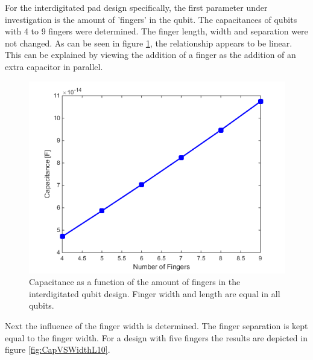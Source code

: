 For the interdigitated pad design specifically, the first parameter under investigation is the amount of 'fingers' in the  qubit. The capacitances of qubits with 4 to 9 fingers were determined. The finger length, width and separation were not changed.
As can be seen in figure \ref{fig:CapVSFingers}, the relationship appears to be linear. This can be explained by viewing the addition of a finger as the addition of an extra capacitor in parallel.\\

\begin{figure}
	\centering
	\includegraphics[scale = 0.7]{Figures/Capacitance_Plots/CapVSFingers.png}
	\caption{Capacitance as a function of the amount of fingers in the interdigitated qubit design. Finger width and length are equal in all qubits.}
	\label{fig:CapVSFingers}
\end{figure}

Next the influence of the finger width is determined. The finger separation is kept equal to the finger width. For a design with five fingers the results are depicted in figure \ref{fig:CapVSWidthL10}. \\


